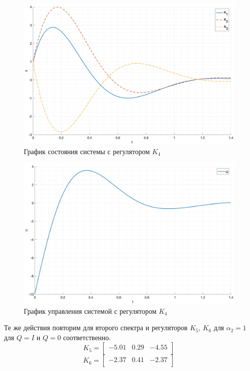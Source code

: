 \begin{figure}[ht!]
    \centering
    \includegraphics[width=\textwidth]{media/plots/task1_6_x.png}
    \caption{График состояния системы с регулятором $K_4$}
    \label{fig:task1_6_x}
\end{figure}
\begin{figure}[ht!]
    \centering
    \includegraphics[width=\textwidth]{media/plots/task1_6_u.png}
    \caption{График управления системой с регулятором $K_4$}
    \label{fig:task1_6_u}
\end{figure}

\FloatBarrier

Те же действия повторим для второго спектра и регуляторов $K_5$, $K_6$ для $\alpha_2 = 1$ для $Q = I$ и $Q = 0$ соответственно.
\begin{equation}
    K_5 = \begin{bmatrix}
        -5.01  & 0.29  & -4.55 \\ 
        \end{bmatrix}
\end{equation}
\begin{equation}
    K_6 = \begin{bmatrix}
        -2.37  & 0.41  & -2.37 \\ 
    \end{bmatrix}
\end{equation}

